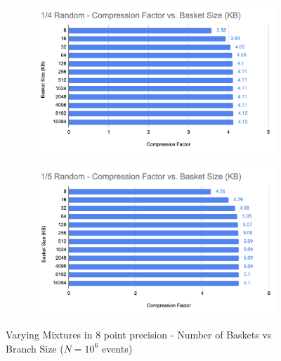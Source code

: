 \begin{figure}[h]
\begin{subfigure}{.5\textwidth}
        \label{fig:toymodel_328_compF_vs_basketsize_subB}
      \end{subfigure}%
      \linebreak
      \begin{subfigure}{.5\textwidth}
        \centering
        \includegraphics[width=\textwidth]{content/toymodel_content/3.28/1_of_4.png}
        \label{fig:toymodel_328_compF_vs_basketsize_subC}
      \end{subfigure}%
      \begin{subfigure}{.5\textwidth}
        \centering
        \includegraphics[width=\textwidth]{content/toymodel_content/3.28/1_of_5.png}
        \label{fig:toymodel_328_compF_vs_basketsize_subD}
      \end{subfigure}%
    \caption{Varying Mixtures in 8 point precision - Number of Baskets vs Branch Size ($N=10^6$ events)}
    \label{fig:toymodel_328_compF_vs_basketsize}
\end{figure}

